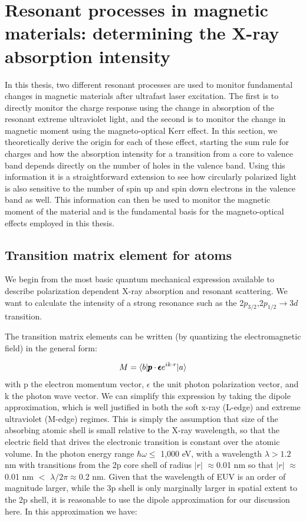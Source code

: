 \section{Resonant processes in magnetic materials: determining the X-ray absorption intensity}

In this thesis, two different resonant processes are used to monitor fundamental changes in magnetic materials after ultrafast laser excitation. The first is to directly monitor the charge response using the change in absorption of the resonant extreme ultraviolet light, and the second is to monitor the change in magnetic moment using the magneto-optical Kerr effect. In this section, we theoretically derive the origin for each of these effect, starting the sum rule for charges and how the absorption intensity for a transition from a core to valence band depends directly on the number of holes in the valence band. Using this information it is a straightforward extension to see how circularly polarized light is also sensitive to the number of spin up and spin down electrons in the valence band as well. This information can then be used to monitor the magnetic moment of the material and is the fundamental basis for the magneto-optical effects employed in this thesis.

\subsection{Transition matrix element for atoms}

We begin from the most basic quantum mechanical expression available to describe polarization dependent X-ray absorption and resonant scattering. We want to calculate the intensity of a strong resonance such as the 2$p_{3/2}$,2$p_{1/2}\rightarrow3d$ transition.

The transition matrix elements can be written (by quantizing the electromagnetic field) in the general form:

\begin{equation}
M = \braket{b| \pmb{p}\cdot \pmb{\epsilon} e^{ik\cdot r}|a}
\end{equation}
with p the electron momentum vector, $\epsilon$ the unit photon polarization vector, and k the photon wave vector. We can simplify this expression by taking the dipole approximation, which is well justified in both the soft x-ray (L-edge) and extreme ultraviolet (M-edge) regimes. This is simply the assumption that size of the absorbing atomic shell is small relative to the X-ray wavelength, so that the electric field that drives the electronic transition is constant over the atomic volume. In the photon energy range $\hbar\omega\leq$ 1,000 eV, with a wavelength $\lambda>1.2$ nm with transitions from the 2p core shell of radius $|r|$ $\approx$0.01 nm so that $|r|$ $\approx$0.01 nm $<$ $\lambda/2\pi\approx$0.2 nm. Given that the wavelength of EUV is an order of magnitude larger, while the 3p shell is only marginally larger in spatial extent to the 2p shell, it is reasonable to use the dipole approximation for our discussion here. In this approximation we have:

